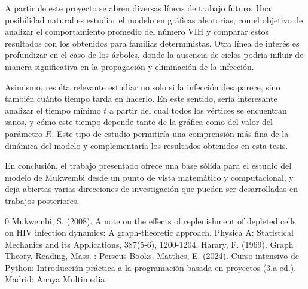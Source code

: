 \documentclass[12pt,titlepage,twoside,openright]{book}
\begin{document}
A partir de este proyecto se abren diversas l\'ineas de trabajo futuro. Una posibilidad natural es estudiar el modelo en gr\'aficas aleatorias, con el objetivo de analizar el comportamiento promedio del n\'umero VIH y comparar estos resultados con los obtenidos para familias deterministas. Otra l\'inea de inter\'es es profundizar en el caso de los \'arboles, donde la ausencia de ciclos podr\'ia influir de manera significativa en la propagaci\'on y eliminaci\'on de la infecci\'on.

Asimismo, resulta relevante estudiar no solo si la infecci\'on desaparece, sino tambi\'en cu\'anto tiempo tarda en hacerlo. En este sentido, ser\'ia interesante analizar el tiempo m\'inimo $t$ a partir del cual todos los v\'ertices se encuentran sanos, y c\'omo este tiempo depende tanto de la gr\'afica como del valor del par\'ametro $R$. Este tipo de estudio permitir\'ia una comprensi\'on m\'as fina de la din\'amica del modelo y complementar\'ia los resultados obtenidos en esta tesis.

En conclusi\'on, el trabajo presentado ofrece una base s\'olida para el estudio del modelo de Mukwembi desde un punto de vista matem\'atico y computacional, y deja abiertas varias direcciones de investigaci\'on que pueden ser desarrolladas en trabajos posteriores.




\begin{thebibliography}{0}
	 Mukwembi, S. (2008). A note on the effects of replenishment of depleted cells on HIV infection dynamics: A graph-theoretic approach. Physica A: Statistical Mechanics and its Applications, 387(5-6), 1200-1204.
     Harary, F. (1969). Graph Theory. Reading, Mass. : Perseus Books.
     Matthes, E. (2024). Curso intensivo de Python: Introducci\'on pr\'actica a la programaci\'on basada en proyectos (3.a ed.). Madrid: Anaya Multimedia.
\end{thebibliography}
\end{document}
